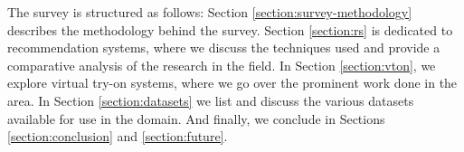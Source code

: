 	The survey is structured as follows: Section \ref{section:survey-methodology} describes the methodology behind the survey. Section \ref{section:rs} is dedicated to recommendation systems, where we discuss the techniques used and provide a comparative analysis of the research in the field. In Section \ref{section:vton}, we explore virtual try-on systems, where we go over the prominent work done in the area. In Section \ref{section:datasets} we list and discuss the various datasets available for use in the domain. And finally, we conclude in Sections \ref{section:conclusion} and \ref{section:future}.